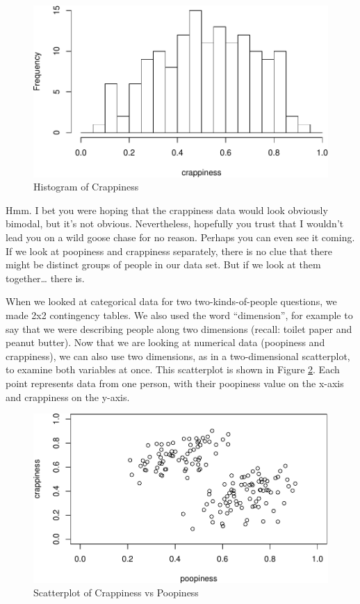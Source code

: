 \documentclass[]{book}
\begin{document}
\begin{figure}
\centering
\includegraphics{bigquestions-book_files/figure-latex/crappy-hist-1.pdf}
\caption{\label{fig:crappy-hist}Histogram of Crappiness}
\end{figure}

Hmm. I bet you were hoping that the crappiness data would look obviously bimodal, but it's not obvious. Nevertheless, hopefully you trust that I wouldn't lead you on a wild goose chase for no reason. Perhaps you can even see it coming. If we look at poopiness and crappiness separately, there is no clue that there might be distinct groups of people in our data set. But if we look at them together\ldots{} there is.

When we looked at categorical data for two two-kinds-of-people questions, we made 2x2 contingency tables. We also used the word ``dimension'', for example to say that we were describing people along two dimensions (recall: toilet paper and peanut butter). Now that we are looking at numerical data (poopiness and crappiness), we can also use two dimensions, as in a two-dimensional scatterplot, to examine both variables at once. This scatterplot is shown in Figure \ref{fig:poopy-crappy}. Each point represents data from one person, with their poopiness value on the x-axis and crappiness on the y-axis.

\begin{figure}
\centering
\includegraphics{bigquestions-book_files/figure-latex/poopy-crappy-1.pdf}
\caption{\label{fig:poopy-crappy}Scatterplot of Crappiness vs Poopiness}
\end{figure}
\end{document}
